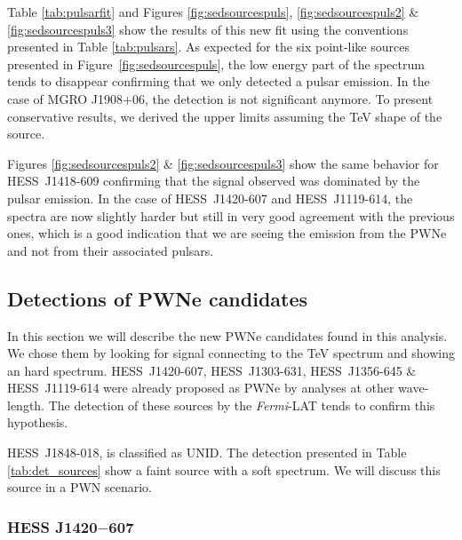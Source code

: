 Table \ref{tab:pulsarfit} and Figures \ref{fig:sedsourcespuls}, \ref{fig:sedsourcespuls2} \& \ref{fig:sedsourcespuls3} show the results of this new fit using the conventions presented in Table \ref{tab:pulsars}. As expected for the six point-like sources presented in Figure~\ref{fig:sedsourcespuls}, the low energy part of the spectrum tends to disappear confirming that we only detected a pulsar emission. In the case of MGRO J1908+06, the detection is not significant anymore. To present conservative results, we derived the upper limits assuming the TeV shape of the source.

Figures \ref{fig:sedsourcespuls2} \& \ref{fig:sedsourcespuls3} show the same behavior for HESS~J1418-609 confirming that the signal observed was dominated by the pulsar emission. In the case of HESS~J1420-607 and HESS~J1119-614, the spectra are now slightly harder but still in very good agreement with the previous ones, which is a good indication that we are seeing the  emission from the PWNe and not from their associated pulsars. 

\subsection{Detections of PWNe candidates}

In this section we will describe the new PWNe candidates found in this analysis. We chose them by looking for signal connecting to the TeV spectrum and showing an hard spectrum. HESS~J1420-607, HESS~J1303-631, HESS~J1356-645 \& HESS~J1119-614 were already proposed as PWNe by analyses at other wave-length. The detection of these sources by the \emph{Fermi}-LAT tends to confirm this hypothesis.

HESS~J1848-018, is classified as UNID. The detection presented in Table \ref{tab:det_sources} show a faint source with a soft spectrum. We will discuss this source in a PWN scenario. 

\subsubsection*{HESS J1420$-$607}

